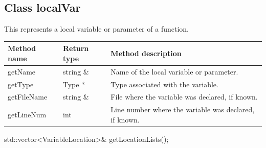 \subsection{Class localVar}
\label{localVar}


This represents a local variable or parameter of a function.


\begin{tabularx}{\textwidth}{llX}
\toprule
Method name & Return type & Method description \\
\midrule
getName & string \& & Name of the local variable or parameter. \\
getType & Type * & Type associated with the variable. \\
getFileName & string \& & File where the variable was declared, if known. \\
getLineNum & int & Line number where the variable was declared, if known. \\
\bottomrule
\end{tabularx}

\begin{apient}
std::vector<VariableLocation>& getLocationLists();
\end{apient}
